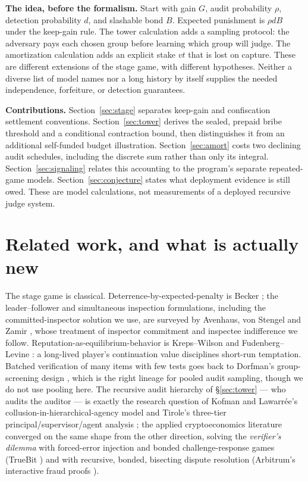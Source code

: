 \documentclass[11pt,a4paper]{article}
\begin{document}
\textbf{The idea, before the formalism.} Start with gain $G$, audit probability $\rho$, detection probability $d$, and slashable bond $B$. Expected punishment is $\rho dB$ under the keep-gain rule. The tower calculation adds a sampling protocol: the adversary pays each chosen group before learning which group will judge. The amortization calculation adds an explicit stake $vt$ that is lost on capture. These are different extensions of the stage game, with different hypotheses. Neither a diverse list of model names nor a long history by itself supplies the needed independence, forfeiture, or detection guarantees.



\textbf{Contributions.} Section~\ref{sec:stage} separates keep-gain and confiscation settlement conventions. Section~\ref{sec:tower} derives the sealed, prepaid bribe threshold and a conditional contraction bound, then distinguishes it from an additional self-funded budget illustration. Section~\ref{sec:amort} costs two declining audit schedules, including the discrete sum rather than only its integral. Section~\ref{sec:signaling} relates this accounting to the program's separate repeated-game models. Section~\ref{sec:conjecture} states what deployment evidence is still owed. These are model calculations, not measurements of a deployed recursive judge system.

\section{Related work, and what is actually new}\label{sec:related}
The stage game is classical. Deterrence-by-expected-penalty is Becker \cite{becker1968}; the leader--follower and simultaneous inspection formulations, including the committed-inspector solution we use, are surveyed by Avenhaus, von Stengel and Zamir \cite{avz2002}, whose treatment of inspector commitment and inspectee indifference we follow. Reputation-as-equilibrium-behavior is Kreps--Wilson \cite{krepswilson1982} and Fudenberg--Levine \cite{fudenberglevine1989}: a long-lived player's continuation value disciplines short-run temptation. Batched verification of many items with few tests goes back to Dorfman's group-screening design \cite{dorfman1943}, which is the right lineage for pooled audit sampling, though we do not use pooling here. The recursive audit hierarchy of \S\ref{sec:tower} --- who audits the auditor --- is exactly the research question of Kofman and Lawarrée's collusion-in-hierarchical-agency model \cite{kofmanlawarree1993} and Tirole's three-tier principal/supervisor/agent analysis \cite{tirole1986}; the applied cryptoeconomics literature converged on the same shape from the other direction, solving the \emph{verifier's dilemma} with forced-error injection and bonded challenge-response games (TrueBit \cite{truebit2017}) and with recursive, bonded, bisecting dispute resolution (Arbitrum's interactive fraud proofs \cite{arbitrum-fraud-proofs}).
\end{document}
